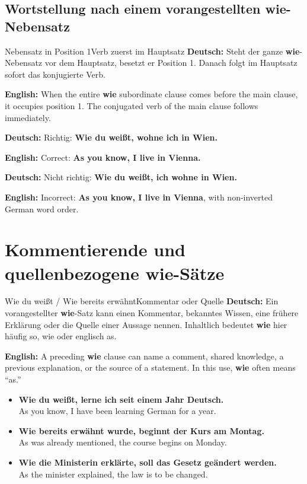 \documentclass[a4paper,11pt]{article}
\newcommand{\GermanText}[1]{\textbf{Deutsch: }#1\par}
\newcommand{\EnglishText}[1]{{\small\color{SoftGray}\textbf{English: }#1\par}}
\newcommand{\ExampleItem}[2]{\item \textbf{#1}\\{\small\color{SoftGray}#2}}
\begin{document}
\subsection{Wortstellung nach einem vorangestellten wie-Nebensatz}

\begin{grammarentry}{Nebensatz in Position 1}{Verb zuerst im Hauptsatz}
\GermanText{Steht der ganze \textbf{wie}-Nebensatz vor dem Hauptsatz, besetzt er Position 1. Danach folgt im Hauptsatz sofort das konjugierte Verb.}
\EnglishText{When the entire \textbf{wie} subordinate clause comes before the main clause, it occupies position 1. The conjugated verb of the main clause follows immediately.}

\GermanText{Richtig: \textbf{Wie du weißt, wohne ich in Wien.}}
\EnglishText{Correct: \textbf{As you know, I live in Vienna.}}

\GermanText{Nicht richtig: \textbf{Wie du weißt, ich wohne in Wien.}}
\EnglishText{Incorrect: \textbf{As you know, I live in Vienna}, with non-inverted German word order.}
\end{grammarentry}

\section{Kommentierende und quellenbezogene wie-Sätze}

\begin{grammarentry}{Wie du weißt / Wie bereits erwähnt}{Kommentar oder Quelle}
\GermanText{Ein vorangestellter \textbf{wie}-Satz kann einen Kommentar, bekanntes Wissen, eine frühere Erklärung oder die Quelle einer Aussage nennen. Inhaltlich bedeutet \textbf{wie} hier häufig \glqq so, wie\grqq{} oder englisch \glqq as\grqq.}
\EnglishText{A preceding \textbf{wie} clause can name a comment, shared knowledge, a previous explanation, or the source of a statement. In this use, \textbf{wie} often means ``as.''}
\end{grammarentry}

\begin{exbox}
\begin{itemize}
\ExampleItem{Wie du weißt, lerne ich seit einem Jahr Deutsch.}{As you know, I have been learning German for a year.}
\ExampleItem{Wie bereits erwähnt wurde, beginnt der Kurs am Montag.}{As was already mentioned, the course begins on Monday.}
\ExampleItem{Wie die Ministerin erklärte, soll das Gesetz geändert werden.}{As the minister explained, the law is to be changed.}
\end{itemize}
\end{exbox}
\end{document}
